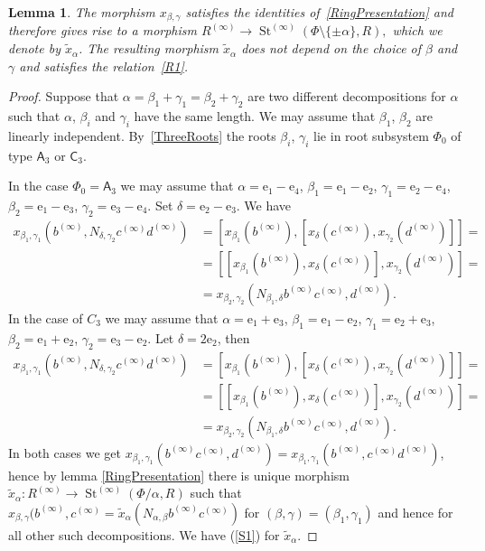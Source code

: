 \documentclass{article}
\newtheorem{lemma}{Lemma} \numberwithin{lemma}{section}
\theoremstyle{definition}
\theoremstyle{remark}
\DeclareMathOperator\St{St}
\newcommand{\rA}{\mathsf{A}}
\newcommand{\rC}{\mathsf{C}}
\begin{document}
\begin{lemma} The morphism $x_{\beta, \gamma}$ satisfies the identities of~\cref{RingPresentation} and therefore gives rise to a morphism
 $R^{(\infty)} \to \St^{(\infty)}(\Phi\setminus\{\pm\alpha\}, R),$ which we denote by $\widetilde{x}_\alpha$. The resulting morphism $\widetilde{x}_\alpha$ does not depend on the choice of $\beta$ and $\gamma$ and satisfies the relation~\eqref{R1}.
\end{lemma}
\begin{proof}
 Suppose that \(\alpha = \beta_1 + \gamma_1 = \beta_2 + \gamma_2\) are two different decompositions for $\alpha$ such that $\alpha$, $\beta_i$ and $\gamma_i$ have the same length. We may assume that \(\beta_1\), \(\beta_2\) are linearly independent. By~\cref{ThreeRoots} the roots $\beta_i$, $\gamma_i$ lie in root subsystem $\Phi_0$ of type \(\rA_3\) or \(\rC_3\). 
 
 In the case \(\Phi_0 = \rA_3\) we may assume that \(\alpha = \mathrm e_1 - \mathrm e_4\), \(\beta_1 = \mathrm e_1 - \mathrm e_2\), \(\gamma_1 = \mathrm e_2 - \mathrm e_4\), \(\beta_2 = \mathrm e_1 - \mathrm e_3\), \(\gamma_2 = \mathrm e_3 - \mathrm e_4\). Set \(\delta = \mathrm e_2 - \mathrm e_3\). We have
 \begin{align*}
 x_{\beta_1, \gamma_1}(b^{(\infty)}, N_{\delta, \gamma_2} c^{(\infty)} d^{(\infty)}) &= [x_{\beta_1}(b^{(\infty)}), [x_\delta(c^{(\infty)}), x_{\gamma_2}(d^{(\infty)})]] =\\
 &= [[x_{\beta_1}(b^{(\infty)}), x_\delta(c^{(\infty)})], x_{\gamma_2}(d^{(\infty)})] =\\
 &= x_{\beta_2, \gamma_2}(N_{\beta_1, \delta} b^{(\infty)} c^{(\infty)}, d^{(\infty)}).
 \end{align*}
 In the case of \(C_3\) we may assume that \(\alpha = \mathrm e_1 + \mathrm e_3\), \(\beta_1 = \mathrm e_1 - \mathrm e_2\), \(\gamma_1 = \mathrm e_2 + \mathrm e_3\), \(\beta_2 = \mathrm e_1 + \mathrm e_2\), \(\gamma_2 = \mathrm e_3 - \mathrm e_2\). Let \(\delta = 2 \mathrm e_2\), then
 \begin{align*}
 x_{\beta_1, \gamma_1}(b^{(\infty)}, N_{\delta, \gamma_2} c^{(\infty)} d^{(\infty)}) &= [x_{\beta_1}(b^{(\infty)}), [x_{\delta}(c^{(\infty)}), x_{\gamma_2}(d^{(\infty)})]] =\\
 &= [[x_{\beta_1}(b^{(\infty)}), x_\delta(c^{(\infty)})], x_{\gamma_2}(d^{(\infty)})] =\\
 &= x_{\beta_2, \gamma_2}(N_{\beta_1, \delta} b^{(\infty)} c^{(\infty)}, d^{(\infty)}).
 \end{align*}
 In both cases we get \(x_{\beta_1, \gamma_1}(b^{(\infty)} c^{(\infty)}, d^{(\infty)}) = x_{\beta_1, \gamma_1}(b^{(\infty)}, c^{(\infty)} d^{(\infty)})\), hence by lemma \ref{RingPresentation} there is unique morphism \(\widetilde x_\alpha \colon R^{(\infty)} \to \St^{(\infty)}(\Phi / \alpha, R)\) such that \(x_{\beta, \gamma}(b^{(\infty)}, c^{(\infty)} = \widetilde x_\alpha(N_{\alpha, \beta} b^{(\infty)} c^{(\infty)})\) for \((\beta, \gamma) = (\beta_1, \gamma_1)\) and hence for all other such decompositions. We have (\ref{S1}) for \(\widetilde x_\alpha\).
\end{proof}
\end{document}
